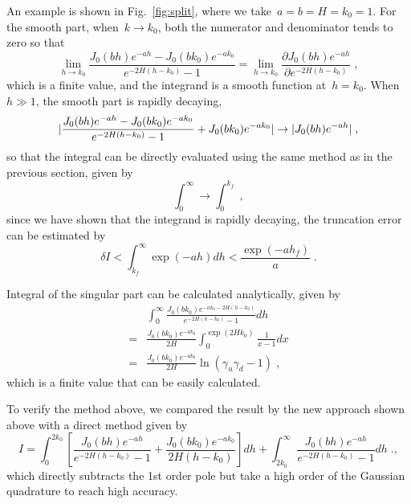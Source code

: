 An example is shown in Fig.~\ref{fig:split}, where we take~$a = b = H = k_0 = 1$.
For the smooth part, when~$k \to k_0$, both the numerator and denominator tends to zero so that
\begin{equation}
    \lim_{h \to k_0} \frac{J_0(bh) e^{- a h} - J_0(bk_0) e^{- a k_0}}{e^{- 2 H (h - k_0)} - 1}  = \lim_{h \to k_0} \frac{ \partial {J_0(bh) e^{- a h}}}{ \partial {e^{- 2 H (h - k_0)}}}\;,
\end{equation}
which is a finite value, and the integrand is a smooth function at~$h = k_0$.
When~$h \gg 1$, the smooth part is rapidly decaying, 
\begin{equation}
    \lvert\frac{J_0(bh) e^{- a h} - J_0(bk_0) e^{- a k_0}}{e^{- 2 H (h - k_0)} - 1} + J_0(bk_0) e^{- a k_0} \rvert \to \lvert J_0(bh) e^{- a h}\rvert\;,
\end{equation}
so that the integral can be directly evaluated using the same method as in the previous section, given by
\begin{equation}
    \int_0^{\infty} \to \int_0^{k_f}\;,
\end{equation}
since we have shown that the integrand is rapidly decaying, the truncation error can be estimated by
\begin{equation}
    \delta I < \int_{k_f}^{\infty} \exp{(-a h)} dh < \frac{\exp{(-a h_f)}}{a}\;.
\end{equation}

Integral of the singular part can be calculated analytically, given by
\begin{equation}
    \begin{split}
        & \int_0^{\infty} \frac{J_0(bk_0) e^{- a k_0 - 2 H (h - k_0)}}{e^{- 2 H (h - k_0)} - 1} dh\\
        = & \frac{J_0(bk_0) e^{- a k_0}}{2H} \int_{0}^{\exp{(2 H k_0)}} \frac{1}{x - 1} dx\\
        = & \frac{J_0(bk_0) e^{- a k_0}}{2H} \ln{(\gamma_u \gamma_d - 1)}\;,
    \end{split}
\end{equation}
which is a finite value that can be easily calculated.

To verify the method above, we compared the result by the new approach shown above with a direct method given by
\begin{equation}
        I = \int_{0}^{2 k_0} \left[\frac{J_0(bh)e^{-ah}}{e^{-2H(h-k_0)} - 1} + \frac{J_0(bk_0)e^{-ak_0}}{2H(h - k_0)}\right] dh + \int_{2 k_0}^{\infty} \frac{J_0(bh)e^{-ah}}{e^{-2H(h-k_0)} - 1} dh\;.,\label{eq:direct}
\end{equation}
which directly subtracts the 1st order pole but take a high order of the Gaussian quadrature to reach high accuracy.

